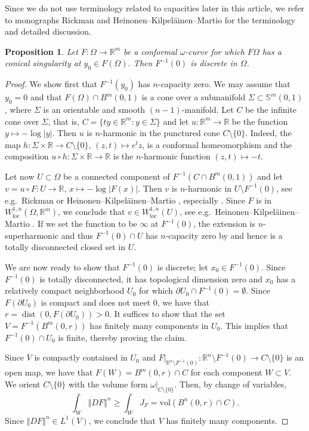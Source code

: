 \documentclass[a4paper,leqno,11pt]{amsart}
\numberwithin{equation}{section}
\newtheorem{proposition}[theorem]{Proposition}
\theoremstyle{remark}
\theoremstyle{remark}
\newcommand{\R}{\mathbb{R}}
\DeclareMathOperator{\dist}{dist}
\DeclareMathOperator{\loc}{loc}
\newcommand{\norm}[1]{ \left\Vert #1 \right\Vert }	%
\newcommand{\vol}{\mathrm{vol}}
\newcommand{\bS}{\mathbb{S}}
\begin{document}
Since we do not use terminology related to capacities later in this article, we refer to monographs Rickman \cite[Section II.10]{Ric:93} and Heinonen--Kilpel\"ainen--Martio \cite[Section 2]{Hei:Kil:Mar:06} for the terminology and detailed discussion.

\begin{proposition}
\label{prop:conical-singularities}
Let $F \colon \Omega \to \R^m$ be a conformal $\omega$-curve for which $F\Omega$ has a conical singularity at $y_0 \in F( \Omega )$. Then $F^{-1}(0)$ is discrete in $\Omega$.
\end{proposition}
\begin{proof}
We show first that $F^{-1}(y_0)$ has $n$-capacity zero. We may assume that $y_0=0$ and that $F(\Omega) \cap B^m(0,1)$ is a cone over a submanifold $\Sigma \subset \bS^m(0,1)$, where $\Sigma$ is an orientable and smooth $(n-1)$-manifold. Let $C$ be the infinite cone over $\Sigma$, that is, $C = \{ ty \in \R^m \colon y\in \Sigma\}$ and let $u \colon \R^m \to \R$ be the function $y \mapsto -\log |y|$. Then $u$ is $n$-harmonic in the punctured cone $C\setminus \{0\}$. Indeed, the map $h \colon \Sigma \times \R \to C\setminus \{0\}$, $(z,t) \mapsto e^t z$, is a conformal homeomorphism and the composition $u \circ h \colon \Sigma \times \R \to \R$ is the $n$-harmonic function $(z,t) \mapsto -t$. 

Let now $U \subset \Omega$ be a connected component of $F^{-1}(C \cap B^m(0,1))$ 
and let $v = u \circ F \colon U \to \R$, $x\mapsto -\log|F(x)|$. 
Then $v$ is $n$-harmonic in $U\setminus F^{-1}(0)$, see e.g.~Rickman \cite[Section VI.2]{Ric:93} 
or Heinonen--Kilpeläinen--Martio \cite[Theorem 14.19]{Hei:Kil:Mar:06}, 
especially \cite[Corollary VI.2.8]{Ric:93}. Since $F$ is in $W^{1,n}_{\loc}(\Omega, \R^m)$, 
we conclude that $v \in W^{1,n}_{\loc}(U)$, see e.g.~Heinonen--Kilpel\"ainen--Martio 
\cite[Theorem 14.28]{Hei:Kil:Mar:06}. If we set the function to be $\infty$ at $F^{-1}(0)$, the extension is $n$-superharmonic and thus $F^{-1}(0) \cap U$ has $n$-capacity zero by \cite[Theorem 10.1]{Hei:Kil:Mar:06} and hence is a totally disconnected closed set in $U$. 

We are now ready to show that $F^{-1}(0)$ is discrete; let $x_0\in F^{-1}(0)$. Since $F^{-1}(0)$ is totally disconnected, it has topological dimension zero and $x_0$ has a relatively compact neighborhood $U_0$ for which $\partial U_0 \cap F^{-1}(0) = \emptyset$. Since $F(\partial U_0)$ is compact and does not meet $0$, we have that $r= \dist(0,F(\partial U_0)) >0$. It suffices to show that the set $V=F^{-1}(B^m(0,r))$ has finitely many components in $U_0$. This implies that $F^{-1}(0) \cap U_0$ is finite, thereby proving the claim.

Since $\overline{V}$ is compactly contained in $U_0$ and $F|_{\R^n\setminus F^{-1}(0)} \colon \R^n \setminus F^{-1}(0) \to C\setminus \{0\}$ is an open map, we have that $F(W)=B^m(0,r)\cap C$ for each component $W\subset V$. We orient $C\setminus \{0\}$ with the volume form $\omega|_{C\setminus \{0\}}$. Then, by change of variables, 
\[
\int_W \norm{DF}^n \ge \int_W J_F = \vol(B^n(0,r)\cap C).
\]
Since $\norm{DF}^n\in L^1(V)$, we conclude that $V$ has finitely many components. 
\end{proof}
\end{document}
